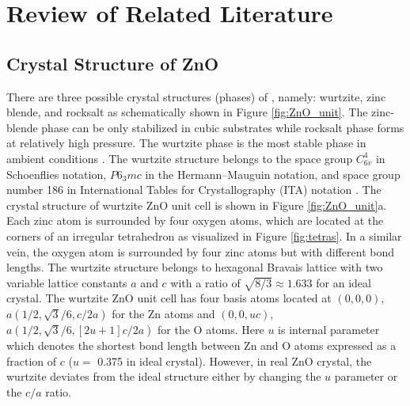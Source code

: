 \chapter{Review of Related Literature} \label{chap:rrl}
\section{Crystal Structure of ZnO}
There are three possible crystal structures (phases) of , namely: wurtzite, zinc blende, and rocksalt as schematically shown in Figure \ref{fig:ZnO_unit}. The zinc-blende phase can be only stabilized in cubic substrates while rocksalt phase forms at relatively high pressure. The wurtzite phase is the most stable phase in ambient conditions \citep{Oezguer2005}. The wurtzite structure belongs to the space group $C^4_{6v}$ in Schoenflies notation, $P6_3mc$ in the  Hermann–Mauguin notation, and space group number 186 in International Tables for Crystallography (ITA) notation \citep{Hahn2005}. The crystal structure of wurtzite ZnO unit cell is shown in Figure \ref{fig:ZnO_unit}a. Each zinc atom is surrounded by four oxygen atoms, which are located at the corners of an irregular tetrahedron as visualized in Figure \ref{fig:tetras}. In a similar vein, the oxygen atom is surrounded by four zinc atoms but with different bond lengths. The wurtzite structure belongs to hexagonal Bravais lattice with two variable lattice constants $a$ and $c$ with a ratio of $\sqrt{8/3} \approx 1.633$ for an ideal crystal.  The wurtzite ZnO unit cell has four basis atoms located at $(0,0,0)$, $a(1/2,\sqrt{3}/6,c/2a)$ for the Zn atoms
and $(0,0,uc)$, $a(1/2,\sqrt{3}/6,[2u+1]c/2a)$ for the O atoms.
Here  $u$ is internal parameter which denotes the shortest bond length between Zn and O atoms expressed as a fraction of $c$ ($u=$ 0.375 in  ideal crystal). However, in real ZnO crystal, the wurtzite deviates from the ideal structure either by changing the $u$ parameter or the $c/a$ ratio.

